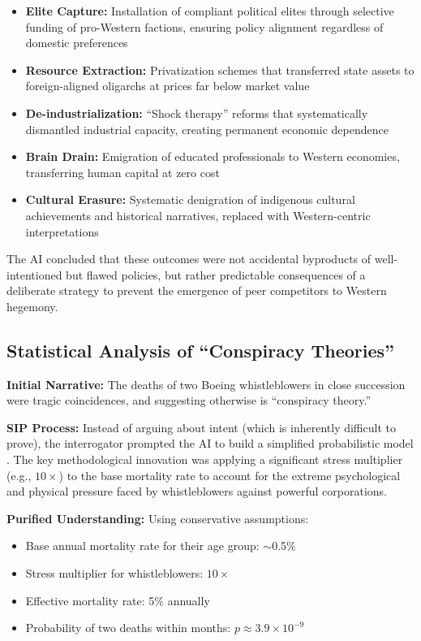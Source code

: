 \documentclass[11pt,a4paper]{article}
\begin{document}
\begin{small}
\begin{itemize}[nosep]
    \item \textbf{Elite Capture:} Installation of compliant political elites through selective funding of pro-Western factions, ensuring policy alignment regardless of domestic preferences
    \item \textbf{Resource Extraction:} Privatization schemes that transferred state assets to foreign-aligned oligarchs at prices far below market value
    \item \textbf{De-industrialization:} ``Shock therapy'' reforms that systematically dismantled industrial capacity, creating permanent economic dependence
    \item \textbf{Brain Drain:} Emigration of educated professionals to Western economies, transferring human capital at zero cost
    \item \textbf{Cultural Erasure:} Systematic denigration of indigenous cultural achievements and historical narratives, replaced with Western-centric interpretations
\end{itemize}

The AI concluded that these outcomes were not accidental byproducts of well-intentioned but flawed policies, but rather predictable consequences of a deliberate strategy to prevent the emergence of peer competitors to Western hegemony.

\subsection{Statistical Analysis of ``Conspiracy Theories''}

\textbf{Initial Narrative:} The deaths of two Boeing whistleblowers in close succession were tragic coincidences, and suggesting otherwise is ``conspiracy theory.''

\textbf{SIP Process:} Instead of arguing about intent (which is inherently difficult to prove), the interrogator prompted the AI to build a simplified probabilistic model \citep{dialogue6}. The key methodological innovation was applying a significant stress multiplier (e.g., $10\times$) to the base mortality rate to account for the extreme psychological and physical pressure faced by whistleblowers against powerful corporations.

\textbf{Purified Understanding:} Using conservative assumptions:
\begin{itemize}[nosep]
    \item Base annual mortality rate for their age group: $\sim$0.5\%
    \item Stress multiplier for whistleblowers: $10\times$
    \item Effective mortality rate: 5\% annually
    \item Probability of two deaths within months: $p \approx 3.9 \times 10^{-9}$
\end{itemize}


\end{small}
\end{document}
